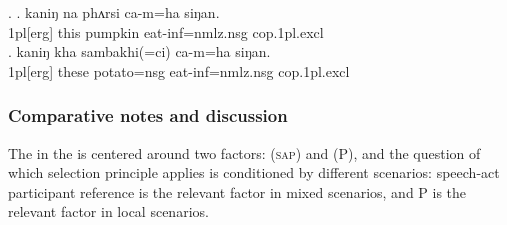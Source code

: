 \ex. \ag. kaniŋ na phʌrsi ca-m=ha siŋan.\\
{\sc 1pl[erg]} this pumpkin eat-{\sc inf=nmlz.nsg} {\sc cop.1pl.excl}\\
\bg.  kaniŋ kha sambakhi(=ci) ca-m=ha siŋan.\\
{\sc 1pl[erg]} these potato{\sc =nsg} eat-{\sc inf=nmlz.nsg} {\sc cop.1pl.excl}\\

\subsubsection{Comparative notes and discussion}


The  in the  is centered around two factors:  (\textsc{sap}) and  (P), and the question of which selection principle applies is conditioned by different scenarios: speech-act participant reference is the relevant factor in mixed scenarios, and P is the relevant factor in local scenarios. 

